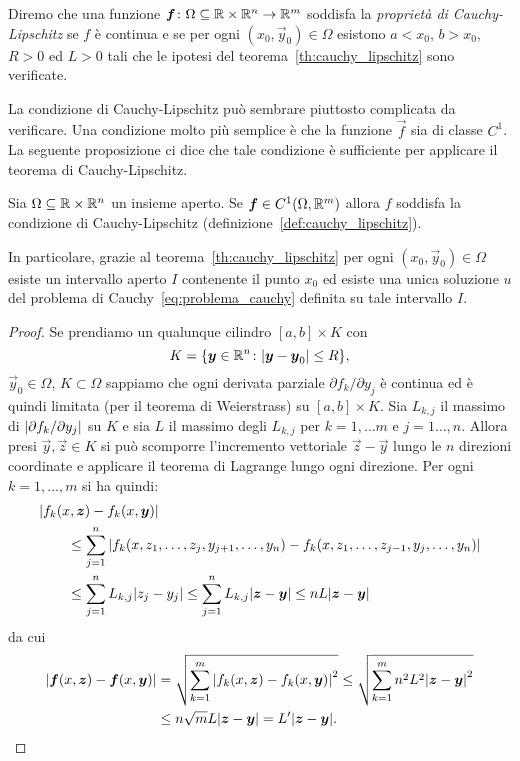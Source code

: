 \begin{definition}%
\label{def:cauchy_lipschitz}%
Diremo che una funzione $\boldsymbol f\colon \Omega\subseteq {\mathbb R}\times {\mathbb R}^n \to {\mathbb R}^m$
soddisfa la \emph{proprietà di Cauchy-Lipschitz}%
 se $f$ è continua e se
per ogni $(x_0,\vec y_0)\in \Omega$ esistono $a<x_0$, $b>x_0$, $R>0$ ed $L>0$
tali che le ipotesi del teorema~\ref{th:cauchy_lipschitz} sono verificate.
\end{definition}
 
La condizione di Cauchy-Lipschitz può sembrare piuttosto complicata
da verificare. Una condizione molto più semplice  è che la funzione $\vec f$
sia di classe $C^1$. La seguente proposizione ci dice che tale
condizione è sufficiente per applicare il teorema di Cauchy-Lipschitz.

\begin{proposition}%
\mymark{***}%
Sia $\Omega \subseteq {\mathbb R}\times {\mathbb R}^n$ un insieme aperto.
Se $\boldsymbol f\in C^1(\Omega,{\mathbb R}^m)$ 
allora $f$ soddisfa la condizione
di Cauchy-Lipschitz (definizione~\ref{def:cauchy_lipschitz}).

In particolare, grazie al teorema~\ref{th:cauchy_lipschitz} 
per ogni $(x_0,\vec y_0)\in \Omega$ esiste un intervallo aperto 
$I$ contenente il punto $x_0$
ed esiste una unica soluzione $u$ 
del problema di Cauchy~\eqref{eq:problema_cauchy} definita 
su tale intervallo $I$.
\end{proposition}
%
\begin{proof}
\mymark{***}%
Se prendiamo un qualunque cilindro $[a,b]\times K$ con 
\[
  K={\left\{ \boldsymbol y\in {\mathbb R}^n\colon {\left|\boldsymbol y-\boldsymbol y_0\right|}\le R \right\}}, 
\]
$\vec y_0\in \Omega$, $K\subset \Omega$
sappiamo che ogni derivata parziale
$\partial f_k / \partial y_j$ è continua ed è quindi limitata
(per il teorema di Weierstrass) su $[a,b]\times K$. 
Sia $L_{k,j}$ il massimo di ${\left|\partial f_k / \partial y_j\right|}$ su $K$ e sia
$L$ il massimo degli $L_{k,j}$ per $k=1,\dots m$ e $j=1\dots,n$.
Allora presi $\vec y, \vec z\in K$ si può scomporre l'incremento vettoriale 
$\vec z - \vec y$ lungo le $n$ direzioni coordinate e applicare il teorema di Lagrange lungo ogni direzione.
Per ogni $k = 1,\dots, m$ si ha quindi:
\begin{align*}
\MoveEqLeft
\abs{f_k(x,\vec z)-f_k(x,\vec y)}\\
&\le \sum_{j=1}^n \abs{f_k(x,z_1, \dots, z_j, y_{j+1}, \dots, y_n) - f_k(x,z_1, \dots, z_{j-1}, y_j, \dots, y_n)}\\
&\le \sum_{j=1}^n L_{k,j} \abs{z_j-y_j}
\le \sum_{j=1}^n L_{k,j} \abs{\vec z-\vec y}
\le n L \abs{\vec z-\vec y}
\end{align*}
da cui
\begin{align*}
  {\left|\boldsymbol f(x,\boldsymbol z) - \boldsymbol f(x,\boldsymbol y)\right|}
  &= \sqrt{\sum_{k=1}^m {\left|f_k(x,\boldsymbol z) - f_k(x,\boldsymbol y)\right|}^2} 
  \le \sqrt{\sum_{k=1}^m n^2 L^2 {\left|\boldsymbol z-\boldsymbol y\right|}^2} \\
  &\le n\sqrt{m} L {\left|\boldsymbol z-\boldsymbol y\right|} = L' {\left|\boldsymbol z-\boldsymbol y\right|}.
\end{align*}
\end{proof}

